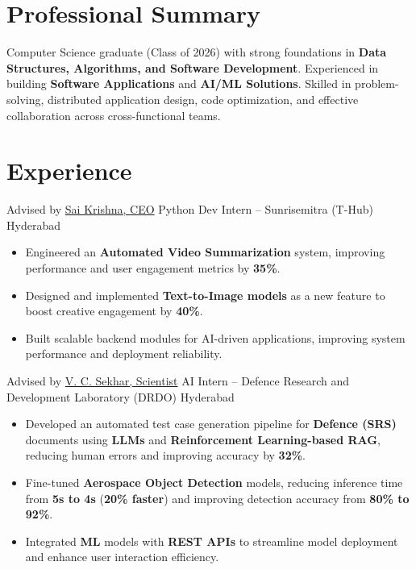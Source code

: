 \documentclass[11pt,a4paper,sans]{moderncv}
\begin{document}
\makecvtitle
\vspace{-1.4cm}

\section{Professional Summary}
\vspace{-0.1cm}
\noindent
Computer Science graduate (Class of 2026) with strong foundations in \textbf{Data Structures, Algorithms, and Software Development}. Experienced in building \textbf{Software Applications} and \textbf{AI/ML Solutions}. Skilled in problem-solving, distributed application design, code optimization, and effective collaboration across cross-functional teams.



\vspace{-0.3cm}
\section{Experience}
\vspace{-0.1cm}

{Advised by \href{https://www.linkedin.com/in/sai-krishna-chanda-2696472b0/}{\textcolor{color1}{Sai Krishna, CEO}}}
{Python Dev Intern -- Sunrisemitra (T-Hub)}
{Hyderabad}{}
{
\begin{itemize}
    \item Engineered an \textbf{Automated Video Summarization} system, improving performance and user engagement metrics by \textbf{35\%}.
    \item Designed and implemented \textbf{Text-to-Image models} as a new feature to boost creative engagement by \textbf{40\%}.
    \item Built scalable backend modules for AI-driven applications, improving system performance and deployment reliability.
\end{itemize}
}

\vspace{-0.1cm}
{Advised by \href{https://www.linkedin.com/in/chandra-sekhar-vaddi-a19a6599/}{\textcolor{color1}{V. C. Sekhar, Scientist}}}
{AI Intern -- Defence Research and Development Laboratory (DRDO)}
{Hyderabad}{}
{
\begin{itemize}
    \item Developed an automated test case generation pipeline for \textbf{Defence (SRS)} documents using \textbf{LLMs} and \textbf{Reinforcement Learning-based RAG}, reducing human errors and improving accuracy by \textbf{32\%}.
    \item Fine-tuned \textbf{Aerospace Object Detection} models, reducing inference time from \textbf{5s to 4s} (\textbf{20\% faster}) and improving detection accuracy from \textbf{80\% to 92\%}.
    \item Integrated \textbf{ML} models with \textbf{REST APIs} to streamline model deployment and enhance user interaction efficiency.
\end{itemize}
}
\end{document}
